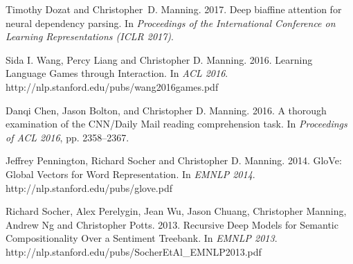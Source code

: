 \documentclass[11pt,letterpaper]{article}
\def\url#1{{\small\sf #1}}
\begin{document}
\begin{vita}
\begin{Products (most closely related)}
\item Timothy Dozat and Christopher~D. Manning.
2017.
Deep biaffine attention for neural dependency parsing.
In {\em Proceedings of the International Conference on Learning
  Representations (ICLR 2017)}.

\item Sida I. Wang, Percy Liang and Christopher D. Manning. 2016.
Learning Language Games through Interaction.
In \emph{ACL 2016}. 
\url{http://nlp.stanford.edu/pubs/wang2016games.pdf}

\item Danqi Chen, Jason Bolton, and Christopher D. Manning. 2016. A
  thorough examination of the CNN\slash Daily Mail reading
  comprehension task. In \emph{Proceedings of ACL 2016}, pp. 2358--2367.

\item Jeffrey Pennington, Richard Socher and Christopher D. Manning. 2014.
GloVe: Global Vectors for Word Representation. In \emph{EMNLP 2014}. \url{http://nlp.stanford.edu/pubs/glove.pdf}

\item Richard Socher, Alex Perelygin, Jean Wu,  Jason Chuang,
  Christopher Manning, Andrew Ng and Christopher Potts. 2013.
Recursive Deep Models for Semantic Compositionality Over a Sentiment
Treebank. In \emph{EMNLP 2013}. \url{http://nlp.stanford.edu/pubs/SocherEtAl\_EMNLP2013.pdf}





\end{Products (most closely related)}
\end{vita}
\end{document}
